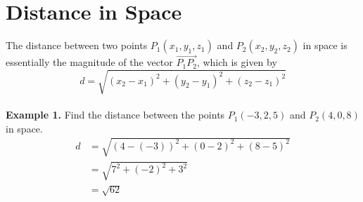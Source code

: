 \chapter{Distance in Space}

\begin{center}
\end{center}
The distance between two points $P_1(x_1, y_1, z_1)$ and $P_2(x_2, y_2, z_2)$
in space is essentially the magnitude of the vector $\overrightarrow{P_1P_2}$,
which is given by \[d = \sqrt{(x_2 - x_1)^2 + (y_2 - y_1)^2 + (z_2 - z_1)^2}\]
~\\
\noindent\textbf{Example 1. } Find the distance between the points $P_1(-3, 2, 5)$ and $P_2(4, 0, 8)$ in space.
\begin{align*}
    d & = \sqrt{(4 - (-3))^2 + (0 - 2)^2 + (8 - 5)^2} \\
      & = \sqrt{7^2 + (-2)^2 + 3^2}                   \\
      & = \sqrt{62}
\end{align*}

